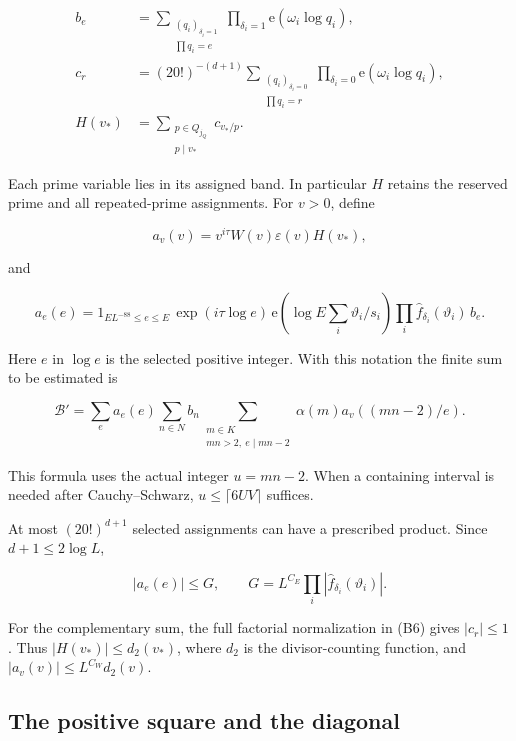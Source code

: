 \[
\begin{aligned}
b_e&=\sum_{\substack{(q_i)_{\delta_i=1}\\\prod q_i=e}}
        \prod_{\delta_i=1}\mathrm e(\omega_i\log q_i),\\
c_r&=(20!)^{-(d+1)}
      \sum_{\substack{(q_i)_{\delta_i=0}\\\prod q_i=r}}
        \prod_{\delta_i=0}\mathrm e(\omega_i\log q_i),\\
H(v_*)&=\sum_{\substack{p\in Q_{j_Q}\\p\mid v_*}}c_{v_*/p}.
\end{aligned} \tag{B6}
\]

Each prime variable lies in its assigned band. In particular \(H\)
retains the reserved prime and all repeated-prime assignments. For
\(v>0\), define

\[
a_v(v)=v^{i\tau}W(v)\varepsilon(v)H(v_*),
\]

and

\[
a_e(e)=1_{EL^{-88}\le e\le E}\,
\exp(i\tau\log e)\,\mathrm e\!\left(\log E\sum_i\vartheta_i/s_i\right)
\prod_i\widehat f_{\delta_i}(\vartheta_i)\,b_e. \tag{B7}
\]

Here \(e\) in \(\log e\) is the selected positive integer. With this
notation the finite sum to be estimated is

\[
\mathcal B'=\sum_e a_e(e)\sum_{n\in N}b_n
 \sum_{\substack{m\in K\\mn>2,\ e\mid mn-2}}
 \alpha(m)a_v((mn-2)/e). \tag{B8}
\]

This formula uses the actual integer \(u=mn-2\). When a containing
interval is needed after Cauchy--Schwarz, \(u\le\lceil6UV\rceil\)
suffices.

At most \((20!)^{d+1}\) selected assignments can have a prescribed
product. Since \(d+1\le2\log L\),

\[
|a_e(e)|\le G,
\qquad
G=L^{C_E}\prod_i|\widehat f_{\delta_i}(\vartheta_i)|. \tag{B9}
\]

For the complementary sum, the full factorial normalization in (B6)
gives \(|c_r|\le1\). Thus \(|H(v_*)|\le d_2(v_*)\), where \(d_2\) is the
divisor-counting function, and \(|a_v(v)|\le L^{C_W}d_2(v)\).


\hypertarget{bilinear-the-positive-square-and-the-diagonal}{%
\subsection{The positive square and the
diagonal}\label{bilinear-the-positive-square-and-the-diagonal}}

